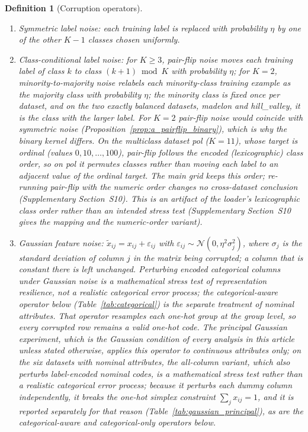 \documentclass[pdflatex,sn-mathphys]{sn-jnl}
\theoremstyle{thmstyleone}
\theoremstyle{thmstyletwo}
\theoremstyle{thmstylethree}
\newtheorem{definition}{Definition}
\begin{document}
\begin{definition}[Corruption operators]\label{def:operators}
\begin{enumerate}
\item \emph{Symmetric label noise}: each training label is replaced with probability $\eta$ by one of the other $K-1$ classes chosen uniformly.
\item \emph{Class-conditional label noise}: for $K\ge3$, \emph{pair-flip} noise moves each training label of class $k$ to class $(k+1)\bmod K$ with probability $\eta$; for $K=2$, \emph{minority-to-majority} noise relabels each minority-class training example as the majority class with probability $\eta$; the minority class is fixed once per dataset, and on the two exactly balanced datasets, madelon and hill\_valley, it is the class with the larger label. For $K=2$ pair-flip noise would coincide with symmetric noise (Proposition~\ref{prop:a_pairflip_binary}), which is why the binary kernel differs. On the multiclass dataset pol ($K=11$), whose target is ordinal (values $0,10,\dots,100$), pair-flip follows the encoded (lexicographic) class order, so on pol it permutes classes rather than moving each label to an adjacent value of the ordinal target. The main grid keeps this order; re-running pair-flip with the numeric order changes no cross-dataset conclusion (Supplementary Section~S10). This is an artifact of the loader's lexicographic class order rather than an intended stress test (Supplementary Section~S10 gives the mapping and the numeric-order variant).
\item \emph{Gaussian feature noise}: $\tilde x_{ij}=x_{ij}+\varepsilon_{ij}$ with $\varepsilon_{ij}\sim\mathcal{N}(0,\eta^{2}\sigma_j^{2})$, where $\sigma_j$ is the standard deviation of column $j$ in the matrix being corrupted; a column that is constant there is left unchanged. Perturbing encoded categorical columns under Gaussian noise is a mathematical stress test of representation resilience, not a realistic categorical error process; the categorical-aware operator below (Table~\ref{tab:categorical}) is the separate treatment of nominal attributes. That operator resamples each one-hot group at the group level, so every corrupted row remains a valid one-hot code. The principal Gaussian experiment, which is the Gaussian condition of every analysis in this article unless stated otherwise, applies this operator to continuous attributes only; on the six datasets with nominal attributes, the all-column variant, which also perturbs label-encoded nominal codes, is a mathematical stress test rather than a realistic categorical error process; because it perturbs each dummy column independently, it breaks the one-hot simplex constraint $\sum_j x_{ij}=1$, and it is reported separately for that reason (Table~\ref{tab:gaussian_principal}), as are the categorical-aware and categorical-only operators below.

\end{enumerate}
\end{definition}
\end{document}
